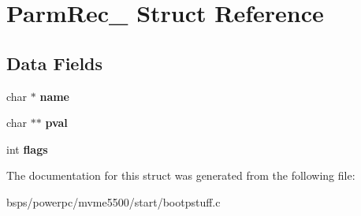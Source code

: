 \hypertarget{structParmRec__}{}\section{Parm\+Rec\+\_\+ Struct Reference}
\label{structParmRec__}
\subsection*{Data Fields}
\begin{DoxyCompactItemize}
\item 
\mbox{\label{structParmRec___a2209fda785e251c20f96fcaded98a86d}} 
char $\ast$ {\bfseries name}
\item 
\mbox{\label{structParmRec___afe6f49ccaa95e66207c77d29dc0f516c}} 
char $\ast$$\ast$ {\bfseries pval}
\item 
\mbox{\label{structParmRec___a0e78d941f7cc892784fe47e95126b6c0}} 
int {\bfseries flags}
\end{DoxyCompactItemize}


The documentation for this struct was generated from the following file\+:\begin{DoxyCompactItemize}
\item 
bsps/powerpc/mvme5500/start/bootpstuff.\+c\end{DoxyCompactItemize}
